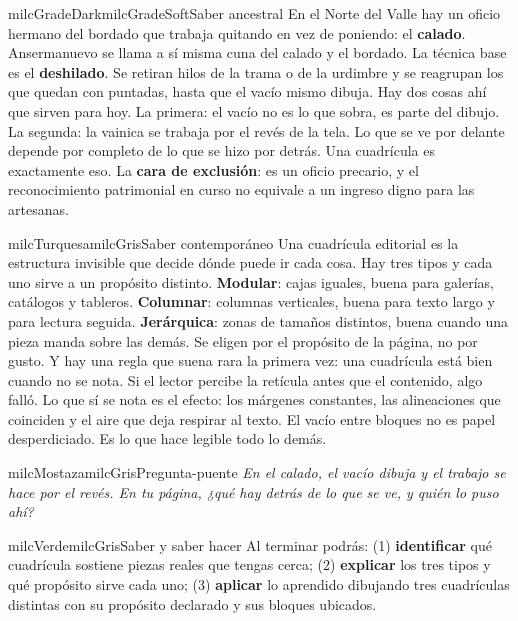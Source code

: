 \documentclass[11pt,letterpaper]{article}
\begin{document}
\begin{softbox}{milcGradeDark}{milcGradeSoft}{Saber ancestral}
En el Norte del Valle hay un oficio hermano del bordado que trabaja quitando en vez de poniendo: el \textbf{calado}. Ansermanuevo se llama a sí misma cuna del calado y el bordado. La técnica base es el \textbf{deshilado}. Se retiran hilos de la trama o de la urdimbre y se reagrupan los que quedan con puntadas, hasta que el vacío mismo dibuja. Hay dos cosas ahí que sirven para hoy. La primera: el vacío no es lo que sobra, es parte del dibujo. La segunda: la vainica se trabaja por el revés de la tela. Lo que se ve por delante depende por completo de lo que se hizo por detrás. Una cuadrícula es exactamente eso. La \textbf{cara de exclusión}: es un oficio precario, y el reconocimiento patrimonial en curso no equivale a un ingreso digno para las artesanas.\par{}
\end{softbox}

\begin{softbox}{milcTurquesa}{milcGris}{Saber contemporáneo}
Una cuadrícula editorial es la estructura invisible que decide dónde puede ir cada cosa. Hay tres tipos y cada uno sirve a un propósito distinto. \textbf{Modular}: cajas iguales, buena para galerías, catálogos y tableros. \textbf{Columnar}: columnas verticales, buena para texto largo y para lectura seguida. \textbf{Jerárquica}: zonas de tamaños distintos, buena cuando una pieza manda sobre las demás. Se eligen por el propósito de la página, no por gusto. Y hay una regla que suena rara la primera vez: una cuadrícula está bien cuando no se nota. Si el lector percibe la retícula antes que el contenido, algo falló. Lo que sí se nota es el efecto: los márgenes constantes, las alineaciones que coinciden y el aire que deja respirar al texto. El vacío entre bloques no es papel desperdiciado. Es lo que hace legible todo lo demás.
\end{softbox}

\begin{softbox}{milcMostaza}{milcGris}{Pregunta-puente}
\textit{En el calado, el vacío dibuja y el trabajo se hace por el revés. En tu página, ¿qué hay detrás de lo que se ve, y quién lo puso ahí?}
\end{softbox}

\begin{softbox}{milcVerde}{milcGris}{Saber y saber hacer}
Al terminar podrás: (1) \textbf{identificar} qué cuadrícula sostiene piezas reales que tengas cerca; (2) \textbf{explicar} los tres tipos y qué propósito sirve cada uno; (3) \textbf{aplicar} lo aprendido dibujando tres cuadrículas distintas con su propósito declarado y sus bloques ubicados.
\end{softbox}
\end{document}
